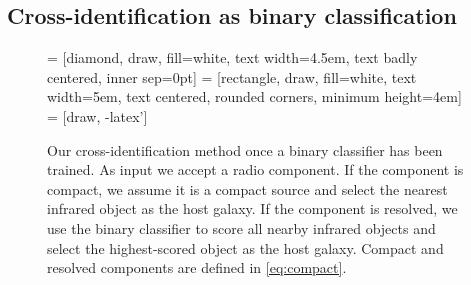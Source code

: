 \documentclass[fleqn,usenatbib,usedcolumn]{mnras}
\newcommand{\edited}[1]{#1}
\begin{document}
  \subsection{Cross-identification as binary classification}\label{sec:xid-as-binary-classification}
    \begin{figure}
      \centering
       = [diamond, draw, fill=white,
          text width=4.5em, text badly centered, inner sep=0pt]
       = [rectangle, draw, fill=white,
          text width=5em, text centered, rounded corners, minimum height=4em]
       = [draw, -latex']
      \caption{\edited{Our cross-identification method once a binary classifier has been trained}. As
        input we accept a radio \edited{component. If the component is compact, we assume it is a compact source and select
        the nearest infrared object as the host galaxy. If the component is
        resolved, we use the binary classifier to score all nearby infrared objects
        and select the highest-scored object as the host galaxy. Compact and resolved components are defined in \autoref{eq:compact}.}}
      \label{fig:flowchart}
    \end{figure}
\end{document}
